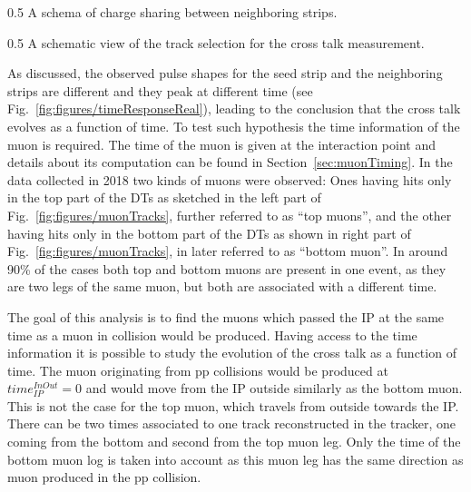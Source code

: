                  {0.5}       %
                 { A schema of charge sharing between neighboring strips. }

                 {0.5}       %
                 { A schematic view of the track selection for the cross talk measurement. }


As discussed, the observed pulse shapes for the seed strip and the neighboring strips are different and they peak at different time (see Fig.~\ref{fig:figures/timeResponseReal}), leading to the conclusion that the cross talk evolves as a function of time. To test such hypothesis the time information of the muon is required. The time of the muon is given at the interaction point and details about its computation can be found in Section~\ref{sec:muonTiming}. In the data collected in 2018 two kinds of muons were observed: Ones having hits only in the top part of the DTs as sketched in the left part of Fig.~\ref{fig:figures/muonTracks}, further referred to as ``top muons'',  and the other having hits only in the bottom part of the DTs as shown in right part of Fig.~\ref{fig:figures/muonTracks}, in later referred to as ``bottom muon''. In around 90\% of the cases both top and bottom muons are present in one event, as they are two legs of the same muon, but both are associated with a different time. 

The goal of this analysis is to find the muons which passed the IP at the same time as a muon in collision would be produced. Having access to the time information it is possible to study the evolution of the cross talk as a function of time. The muon originating from pp collisions would be produced at $time_{IP}^{InOut}=0$ and would move from the IP outside similarly as the bottom muon. This is not the case for the top muon, which travels from outside towards the IP. There can be two times associated to one track reconstructed in the tracker, one coming from the bottom and second from the top muon leg. Only the time of the bottom muon log is taken into account as this muon leg has the same direction as muon produced in the pp collision. 

